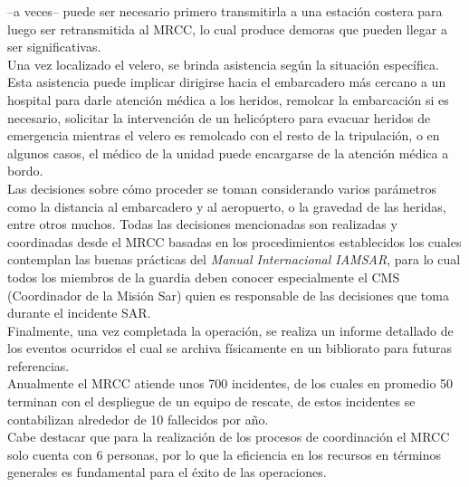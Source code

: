 –a veces– puede ser necesario primero transmitirla a una estación costera para luego ser retransmitida al MRCC, lo cual produce demoras que 
pueden llegar a ser significativas.\\
Una vez localizado el velero, se brinda asistencia según la situación específica. Esta asistencia puede implicar dirigirse hacia el 
embarcadero más cercano a un hospital para darle atención médica a los heridos, remolcar la embarcación si es necesario, solicitar la 
intervención de un helicóptero para evacuar heridos de emergencia mientras el velero es remolcado con el resto de la tripulación, o en 
algunos casos, el médico de la unidad puede encargarse de la atención médica a bordo.\\
Las decisiones sobre cómo proceder se toman considerando varios parámetros como la distancia al embarcadero y al aeropuerto, o la gravedad 
de las heridas, entre otros muchos. Todas las decisiones mencionadas son realizadas y coordinadas desde el MRCC basadas en los 
procedimientos establecidos los cuales contemplan las buenas prácticas del \textit{Manual Internacional IAMSAR}, para lo cual todos los miembros de 
la guardia deben conocer especialmente el CMS (Coordinador de la Misión Sar) quien es responsable de las decisiones que toma durante el 
incidente SAR.\\
Finalmente, una vez completada la operación, se realiza un informe detallado de los eventos ocurridos el cual se archiva físicamente en un 
bibliorato para futuras referencias.\\
Anualmente el MRCC atiende unos 700 incidentes, de los cuales en promedio 50 terminan con el despliegue de un equipo de rescate, de estos 
incidentes se contabilizan alrededor de 10 fallecidos por año.\\
Cabe destacar que para la realización de los procesos de coordinación el MRCC solo cuenta con 6 personas, por lo que la eficiencia en los 
recursos en términos generales es fundamental para el éxito de las operaciones.
